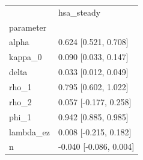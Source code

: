 \begin{tabular}{ll}
\toprule
 & hsa\_steady \\
parameter &  \\
\midrule
alpha & 0.624 [0.521, 0.708] \\
kappa\_0 & 0.090 [0.033, 0.147] \\
delta & 0.033 [0.012, 0.049] \\
rho\_1 & 0.795 [0.602, 1.022] \\
rho\_2 & 0.057 [-0.177, 0.258] \\
phi\_1 & 0.942 [0.885, 0.985] \\
lambda\_ez & 0.008 [-0.215, 0.182] \\
n & -0.040 [-0.086, 0.004] \\
\bottomrule
\end{tabular}
